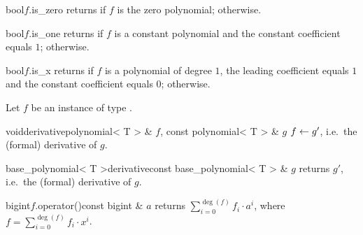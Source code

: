 \begin{cfcode}{bool}{$f$.is_zero}{}
  returns \TRUE if $f$ is the zero polynomial; \FALSE otherwise.
\end{cfcode}

\begin{cfcode}{bool}{$f$.is_one}{}
  returns \TRUE if $f$ is a constant polynomial and the constant coefficient equals $1$; \FALSE
  otherwise.
\end{cfcode}

\begin{cfcode}{bool}{$f$.is_x}{}
  returns \TRUE if $f$ is a polynomial of degree $1$, the leading coefficient equals $1$ and the
  constant coefficient equals $0$; \FALSE otherwise.
\end{cfcode}

%



\HIGH

Let $f$ be an instance of type .

\begin{fcode}{void}{derivative}{polynomial< T > & $f$, const polynomial< T > & $g$}
  $f \leftarrow g'$, i.e.~the (formal) derivative of $g$.
\end{fcode}

\begin{fcode}{base_polynomial< T >}{derivative}{const base_polynomial< T > & $g$}
  returns $g'$, i.e.~the (formal) derivative of $g$.
\end{fcode}

\begin{cfcode}{bigint}{$f$.operator()}{const bigint & $a$}
  returns $\sum_{i=0}^{\deg(f)} f_i \cdot a^i$, where $f = \sum_{i=0}^{\deg(f)} f_i \cdot x^i$.
\end{cfcode}

%



\IO

